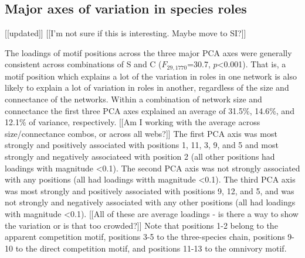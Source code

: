 \documentclass[12pt]{article}
\begin{document}
	\subsection*{Major axes of variation in species roles} [[updated]]
		[[I'm not sure if this is interesting. Maybe move to SI?]]

		The loadings of motif positions across the three major PCA axes were generally consistent across combinations of S and C ($F_{29,1770}$=30.7, $p$\textless0.001). 
		That is, a motif position which explains a lot of the variation in roles in one network is also likely to explain a lot of variation in roles in another, regardless of the size and connectance of the networks. 
		Within a combination of network size and connectance the first three PCA axes explained an average of 31.5\%, 14.6\%, and 12.1\% of variance, respectively. 
		[[Am I working with the average across size/connectance combos, or across all webs?]]
		The first PCA axis was most strongly and positively associated with positions 1, 11, 3, 9, and 5 and most strongly and negatively associateed with position 2 (all other positions had loadings with magnitude \textless0.1). 
		The second PCA axis was not strongly associated with any positions (all had loadings witth magnitude \textless0.1).
		The third PCA axis was most strongly and positively associated with positions 9, 12, and 5, and was not strongly and negatively associated with any other positions (all had loadings with magnitude \textless0.1).
		[[All of these are average loadings - is there a way to show the variation or is that too crowded?]]
		Note that positions 1-2 belong to the apparent competition motif, positions 3-5 to the three-species chain, positions 9-10 to the direct competition motif, and positions 11-13 to the omnivory motif. 
\end{document}
